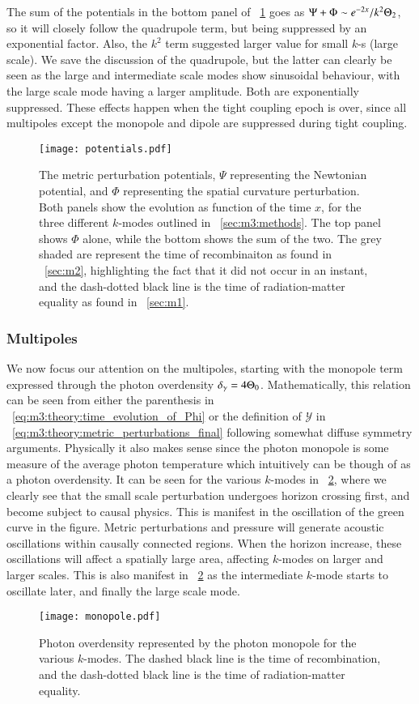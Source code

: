     The sum of the potentials in the bottom panel of ~\cref{fig:m3:potentials} goes as $\Psi+\Phi \sim e^{-2x}/k^2\Theta_2$, so it will closely follow the quadrupole term, but being suppressed by an exponential factor. Also, the $k^2$ term suggested larger value for small $k$-s (large scale). We save the discussion of the quadrupole, but the latter can clearly be seen as the large and intermediate scale modes show sinusoidal behaviour, with the large scale mode having a larger amplitude. Both are exponentially suppressed. These effects happen when the tight coupling epoch is over, since all multipoles except the monopole and dipole are suppressed during tight coupling. 
    \begin{figure}
        \texttt{[image: potentials.pdf]}
        \caption{The metric perturbation potentials, $\Psi$ representing the Newtonian potential, and $\Phi$ representing the spatial curvature perturbation. Both panels show the evolution as function of the time $x$, for the three different $k$-modes outlined in ~\cref{sec:m3:methods}. The top panel shows $\Phi$ alone, while the bottom shows the sum of the two. The grey shaded are represent the time of recombinaiton as found in ~\cref{sec:m2}, highlighting the fact that it did not occur in an instant, and the dash-dotted black line is the time of radiation-matter equality as found in ~\cref{sec:m1}.}
        \label{fig:m3:potentials}
    \end{figure}

\subsubsection{Multipoles}
    We now focus our attention on the multipoles, starting with the monopole term expressed through the photon overdensity $\delta_\gamma = 4\Theta_0$. Mathematically, this relation can be seen  from either the parenthesis in ~\cref{eq:m3:theory:time_evolution_of_Phi} or the definition of $\mathcal{Y}$ in ~\cref{eq:m3:theory:metric_perturbations_final} following somewhat diffuse symmetry arguments. Physically it also makes sense since the photon monopole is some measure of the average photon temperature which intuitively can be though of as a photon overdensity. It can be seen for the various $k$-modes in ~\cref{fig:m3:monopole}, where we clearly see that the small scale perturbation undergoes horizon crossing first, and become subject to causal physics. This is manifest in the oscillation of the green curve in the figure. Metric perturbations and pressure will generate acoustic oscillations within causally connected regions. When the horizon increase, these oscillations will affect a spatially large area, affecting $k$-modes on larger and larger scales. This is also manifest in ~\cref{fig:m3:monopole} as the intermediate $k$-mode starts to oscillate later, and finally the large scale mode. 
    \begin{figure}
        \texttt{[image: monopole.pdf]}
        \caption{Photon overdensity represented by the photon monopole for the various $k$-modes. The dashed black line is the time of recombination, and the dash-dotted black line is the time of radiation-matter equality.}
        \label{fig:m3:monopole}
    \end{figure}

